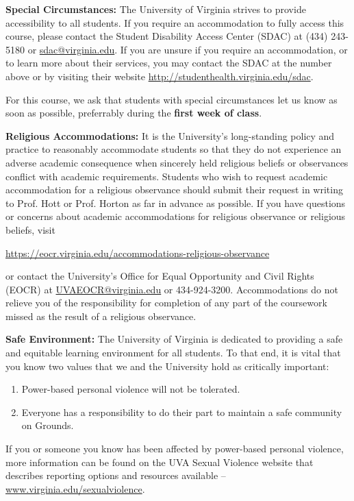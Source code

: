 \documentclass[12pt]{article}
\begin{document}
\textbf{Special Circumstances:} The University of Virginia strives to provide accessibility to all students. If you require an accommodation to fully access this course, please contact the Student Disability Access Center (SDAC) at (434) 243-5180 or \url{sdac@virginia.edu}. If you are unsure if you require an accommodation, or to learn more about their services, you may contact the SDAC at the number above or by visiting their website \url{http://studenthealth.virginia.edu/sdac}.

For this course, we ask that students with special circumstances let us know as soon as possible, preferrably during the \textbf{first week of class}.

\textbf{Religious Accommodations:} It is the University's long-standing policy and practice to reasonably accommodate students so that they do not experience an adverse academic consequence when sincerely held religious beliefs or observances conflict with academic requirements.  Students who wish to request academic accommodation for a religious observance should submit their request in writing to Prof. Hott or Prof. Horton as far in advance as possible. If you have questions or concerns about academic accommodations for religious observance or religious beliefs, visit 

\begin{center} 
    \url{https://eocr.virginia.edu/accommodations-religious-observance}
\end{center}

or contact the University's Office for Equal Opportunity and Civil Rights (EOCR) at \url{UVAEOCR@virginia.edu} or 434-924-3200.  Accommodations do not relieve you of the responsibility for completion of any part of the coursework missed as the result of a religious observance.

\textbf{Safe Environment:} The University of Virginia is dedicated to providing a safe and equitable learning environment for all students. To that end, it is vital that you know two values that we and the University hold as critically important:
 
\begin{enumerate}
    \item Power-based personal violence will not be tolerated. 
    \item Everyone has a responsibility to do their part to maintain a safe community on Grounds.
\end{enumerate}

If you or someone you know has been affected by power-based personal violence, more information can be found on the UVA Sexual Violence website that describes reporting options and resources available -- \url{www.virginia.edu/sexualviolence}. 
   
\end{document}
